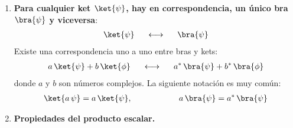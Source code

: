 \begin{enumerate}[label=\alph*)]
\item \textbf{Para cualquier ket $\ket{\psi}$, hay en correspondencia, un único bra $\bra{\psi}$ y viceversa}:
\begin{align}
\ket{\psi} \hspace{0.5cm} \longleftrightarrow \hspace{0.5cm} \bra{\psi}
\label{eq:ecuacion_02_26}
\end{align}
Existe una correspondencia uno a uno entre bras y kets:
\begin{align}
a \, \ket{\psi} + b \, \ket{\phi} \hspace{0.5cm} \longleftrightarrow \hspace{0.5cm} a^{*} \, \bra{\psi}
+ b^{*} \, \bra{\phi} \label{eq:ecuacion_02_27}
\end{align}
donde $a$ y $b$ son números complejos. La siguiente notación es muy común:
\begin{align}
\ket{a \, \psi} =  a \, \ket{\psi}, \hspace{2cm} a \, \bra{\psi} = a^{*} \, \bra{\psi}
\label{eq:ecuacion_02_28}
\end{align}
\item \textbf{Propiedades del producto escalar.}


\end{enumerate}
